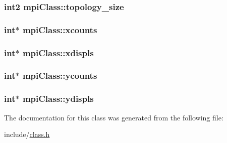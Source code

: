 \subsubsection[{\texorpdfstring{topology\+\_\+size}{topology_size}}]{\setlength{\rightskip}{0pt plus 5cm}int2 mpi\+Class\+::topology\+\_\+size}\hypertarget{classmpi_class_a106d0552c37952ab3a1c9ea7a1c7e8d5}{}\label{classmpi_class_a106d0552c37952ab3a1c9ea7a1c7e8d5}
\subsubsection[{\texorpdfstring{xcounts}{xcounts}}]{\setlength{\rightskip}{0pt plus 5cm}int$\ast$ mpi\+Class\+::xcounts}\hypertarget{classmpi_class_a697f2c2435b42de0be6342b87deafde9}{}\label{classmpi_class_a697f2c2435b42de0be6342b87deafde9}
\subsubsection[{\texorpdfstring{xdispls}{xdispls}}]{\setlength{\rightskip}{0pt plus 5cm}int$\ast$ mpi\+Class\+::xdispls}\hypertarget{classmpi_class_ae3364097a0ec377e155e16b5175519fe}{}\label{classmpi_class_ae3364097a0ec377e155e16b5175519fe}
\subsubsection[{\texorpdfstring{ycounts}{ycounts}}]{\setlength{\rightskip}{0pt plus 5cm}int$\ast$ mpi\+Class\+::ycounts}\hypertarget{classmpi_class_aae0968eba60a3b233d7fb9a7f2d4c9a9}{}\label{classmpi_class_aae0968eba60a3b233d7fb9a7f2d4c9a9}
\subsubsection[{\texorpdfstring{ydispls}{ydispls}}]{\setlength{\rightskip}{0pt plus 5cm}int$\ast$ mpi\+Class\+::ydispls}\hypertarget{classmpi_class_a5b07584bbf4b7795ecf5fb611056f906}{}\label{classmpi_class_a5b07584bbf4b7795ecf5fb611056f906}


The documentation for this class was generated from the following file\+:\begin{DoxyCompactItemize}
\item 
include/\hyperlink{class_8h}{class.\+h}\end{DoxyCompactItemize}
